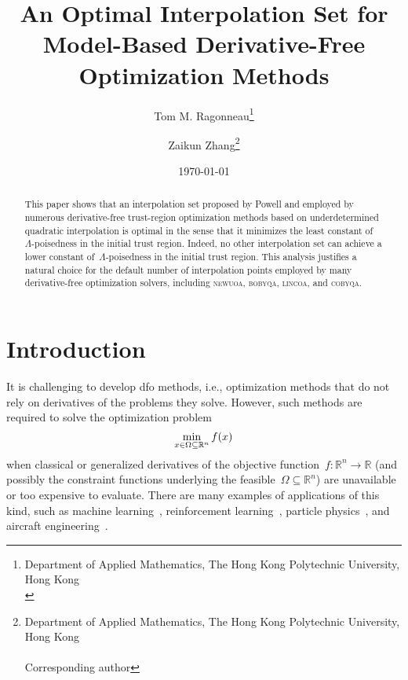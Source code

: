 \documentclass{article}
\title{An Optimal Interpolation Set for Model-Based Derivative-Free Optimization Methods}
\author{
    Tom M. Ragonneau\thanks{
        Department of Applied Mathematics, The Hong Kong Polytechnic University, Hong Kong\\
        \email{tom.ragonneau@polyu.edu.hk} \quad \website[globe-asia]{www.tomragonneau.com}
    }\orcid{0000-0003-2717-2876} \and
    Zaikun Zhang\thanks{
        Department of Applied Mathematics, The Hong Kong Polytechnic University, Hong Kong\\
        \email{zaikun.zhang@polyu.edu.hk} \quad \website[globe-asia]{www.zhangzk.net}\\
        Corresponding author
    }\orcid{0000-0001-8934-8190}
}
\date{\today}
\numberwithin{equation}{section}
\theoremstyle{definition}
\theoremstyle{plain}
\theoremstyle{remark}
\newcommand*{\fset}{\Omega}
\newcommand*{\obj}{f}
\newcommand*{\R}{\mathbb{R}}
\newcommand*{\solvername}[1]{\textsc{#1}\xspace}
\begin{document}
\maketitle

\begin{abstract}
    This paper shows that an interpolation set proposed by Powell and employed by numerous derivative-free trust-region optimization methods based on underdetermined quadratic interpolation is optimal in the sense that it minimizes the least constant of~$\Lambda$-poisedness in the initial trust region.
    Indeed, no other interpolation set can achieve a lower constant of~$\Lambda$-poisedness in the initial trust region.
    This analysis justifies a natural choice for the default number of interpolation points employed by many derivative-free optimization solvers, including \solvername{newuoa}, \solvername{bobyqa}, \solvername{lincoa}, and \solvername{cobyqa}.
\end{abstract}



\section{Introduction}

It is challenging to develop \gls{dfo} methods, i.e., optimization methods that do not rely on derivatives of the problems they solve.
However, such methods are required to solve the optimization problem
\begin{equation}
    \label{eq:nlp}
    \min_{x \in \fset \subseteq \R^n} \obj(x)\\
\end{equation}
when classical or generalized derivatives of the objective function~$\obj \colon \R^n \to \R$ (and possibly the constraint functions underlying the feasible~$\fset \subseteq \R^n$) are unavailable or too expensive to evaluate.
There are many examples of applications of this kind, such as machine learning~\cite{Ghanbari_Scheinberg_2017}, reinforcement learning~\cite{Qian_Yu_2021}, particle physics~\cite{Eldred_Etal_2022}, and aircraft engineering~\cite{Gazaix_Etal_2019}.
\end{document}

